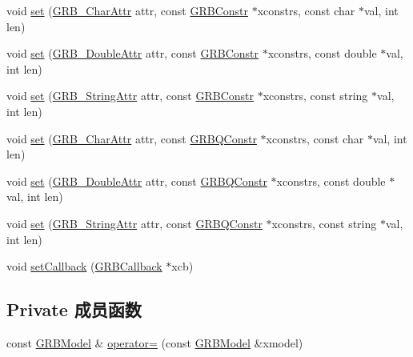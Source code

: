 \begin{DoxyCompactItemize}
\item 
void \hyperlink{classGRBModel_a25a9c48cecb1591882ef210d9d0e4194}{set} (\hyperlink{gurobi__c_09_09_8h_a590e6aa44289cb0563eb6a382794dace}{G\+R\+B\+\_\+\+Char\+Attr} attr, const \hyperlink{classGRBConstr}{G\+R\+B\+Constr} $\ast$xconstrs, const char $\ast$val, int len)
\item 
void \hyperlink{classGRBModel_a47bc449b8837a5934c714053e1f68d26}{set} (\hyperlink{gurobi__c_09_09_8h_a2f43cc28447ce1778973a1f7961e8180}{G\+R\+B\+\_\+\+Double\+Attr} attr, const \hyperlink{classGRBConstr}{G\+R\+B\+Constr} $\ast$xconstrs, const double $\ast$val, int len)
\item 
void \hyperlink{classGRBModel_a5e9935cfc3dab2e22c7c7cb44ca2777c}{set} (\hyperlink{gurobi__c_09_09_8h_a08ffa110d9b1684d689ae53300bb7ec1}{G\+R\+B\+\_\+\+String\+Attr} attr, const \hyperlink{classGRBConstr}{G\+R\+B\+Constr} $\ast$xconstrs, const string $\ast$val, int len)
\item 
void \hyperlink{classGRBModel_a8b062eb2cbef1d7ea95b97583643bf40}{set} (\hyperlink{gurobi__c_09_09_8h_a590e6aa44289cb0563eb6a382794dace}{G\+R\+B\+\_\+\+Char\+Attr} attr, const \hyperlink{classGRBQConstr}{G\+R\+B\+Q\+Constr} $\ast$xconstrs, const char $\ast$val, int len)
\item 
void \hyperlink{classGRBModel_a3208e1d73da529cbb25be520081c136b}{set} (\hyperlink{gurobi__c_09_09_8h_a2f43cc28447ce1778973a1f7961e8180}{G\+R\+B\+\_\+\+Double\+Attr} attr, const \hyperlink{classGRBQConstr}{G\+R\+B\+Q\+Constr} $\ast$xconstrs, const double $\ast$val, int len)
\item 
void \hyperlink{classGRBModel_a64fb0b201ae8dfb6aafb6beb288df157}{set} (\hyperlink{gurobi__c_09_09_8h_a08ffa110d9b1684d689ae53300bb7ec1}{G\+R\+B\+\_\+\+String\+Attr} attr, const \hyperlink{classGRBQConstr}{G\+R\+B\+Q\+Constr} $\ast$xconstrs, const string $\ast$val, int len)
\item 
void \hyperlink{classGRBModel_a0e46642edd2a421500e84ea10dc17008}{set\+Callback} (\hyperlink{classGRBCallback}{G\+R\+B\+Callback} $\ast$xcb)
\end{DoxyCompactItemize}
\subsection*{Private 成员函数}
\begin{DoxyCompactItemize}
\item 
const \hyperlink{classGRBModel}{G\+R\+B\+Model} \& \hyperlink{classGRBModel_ab2e7ffcd6632246a35fc3a05cb02f29b}{operator=} (const \hyperlink{classGRBModel}{G\+R\+B\+Model} \&xmodel)
\end{DoxyCompactItemize}
